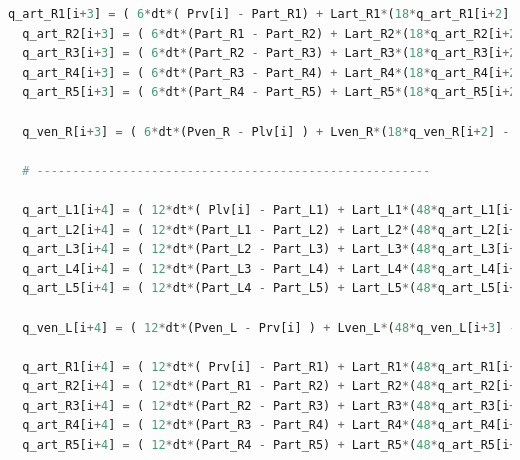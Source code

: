 \begin{lstlisting}[language=Python,caption={Математическая модель сердечно-сосудистой системы на языке программирования Python},label={list:cardiovascular_system_model}]
  q_art_R1[i+3] = ( 6*dt*( Prv[i] - Part_R1) + Lart_R1*(18*q_art_R1[i+2] - 9*q_art_R1[i+1] + 2*q_art_R1[i]) ) / (11*Lart_R1 + 6*dt*(Rart_R1 + Rpv)) 
  q_art_R2[i+3] = ( 6*dt*(Part_R1 - Part_R2) + Lart_R2*(18*q_art_R2[i+2] - 9*q_art_R2[i+1] + 2*q_art_R2[i]) ) / (11*Lart_R2 + 6*dt*Rart_R2)
  q_art_R3[i+3] = ( 6*dt*(Part_R2 - Part_R3) + Lart_R3*(18*q_art_R3[i+2] - 9*q_art_R3[i+1] + 2*q_art_R3[i]) ) / (11*Lart_R3 + 6*dt*Rart_R3)
  q_art_R4[i+3] = ( 6*dt*(Part_R3 - Part_R4) + Lart_R4*(18*q_art_R4[i+2] - 9*q_art_R4[i+1] + 2*q_art_R4[i]) ) / (11*Lart_R4 + 6*dt*Rart_R4)
  q_art_R5[i+3] = ( 6*dt*(Part_R4 - Part_R5) + Lart_R5*(18*q_art_R5[i+2] - 9*q_art_R5[i+1] + 2*q_art_R5[i]) ) / (11*Lart_R5 + 6*dt*Rart_R5)
  
  q_ven_R[i+3] = ( 6*dt*(Pven_R - Plv[i] ) + Lven_R*(18*q_ven_R[i+2] - 9*q_ven_R[i+1] + 2*q_ven_R[i]) ) / (11*Lven_R + 6*dt*(Rven_R + Rmv)) 

  # -------------------------------------------------------

  q_art_L1[i+4] = ( 12*dt*( Plv[i] - Part_L1) + Lart_L1*(48*q_art_L1[i+3] - 36*q_art_L1[i+2] + 16*q_art_L1[i+1] - 3*q_art_L1[i]) ) / (25*Lart_L1 + 12*dt*(Rart_L1 + Rav)) 
  q_art_L2[i+4] = ( 12*dt*(Part_L1 - Part_L2) + Lart_L2*(48*q_art_L2[i+3] - 36*q_art_L2[i+2] + 16*q_art_L2[i+1] - 3*q_art_L2[i]) ) / (25*Lart_L2 + 12*dt*Rart_L2)
  q_art_L3[i+4] = ( 12*dt*(Part_L2 - Part_L3) + Lart_L3*(48*q_art_L3[i+3] - 36*q_art_L3[i+2] + 16*q_art_L3[i+1] - 3*q_art_L3[i]) ) / (25*Lart_L3 + 12*dt*Rart_L3)
  q_art_L4[i+4] = ( 12*dt*(Part_L3 - Part_L4) + Lart_L4*(48*q_art_L4[i+3] - 36*q_art_L4[i+2] + 16*q_art_L4[i+1] - 3*q_art_L4[i]) ) / (25*Lart_L4 + 12*dt*Rart_L4)
  q_art_L5[i+4] = ( 12*dt*(Part_L4 - Part_L5) + Lart_L5*(48*q_art_L5[i+3] - 36*q_art_L5[i+2] + 16*q_art_L5[i+1] - 3*q_art_L5[i]) ) / (25*Lart_L5 + 12*dt*Rart_L5)
     
  q_ven_L[i+4] = ( 12*dt*(Pven_L - Prv[i] ) + Lven_L*(48*q_ven_L[i+3] - 36*q_ven_L[i+2] + 16*q_ven_L[i+1] - 3*q_ven_L[i]) ) / (25*Lven_L + 12*dt*(Rven_L + Rtr)) 

  q_art_R1[i+4] = ( 12*dt*( Prv[i] - Part_R1) + Lart_R1*(48*q_art_R1[i+3] - 36*q_art_R1[i+2] + 16*q_art_R1[i+1] - 3*q_art_R1[i]) ) / (25*Lart_R1 + 12*dt*(Rart_R1 + Rpv)) 
  q_art_R2[i+4] = ( 12*dt*(Part_R1 - Part_R2) + Lart_R2*(48*q_art_R2[i+3] - 36*q_art_R2[i+2] + 16*q_art_R2[i+1] - 3*q_art_R2[i]) ) / (25*Lart_R2 + 12*dt*Rart_R2)
  q_art_R3[i+4] = ( 12*dt*(Part_R2 - Part_R3) + Lart_R3*(48*q_art_R3[i+3] - 36*q_art_R3[i+2] + 16*q_art_R3[i+1] - 3*q_art_R3[i]) ) / (25*Lart_R3 + 12*dt*Rart_R3)
  q_art_R4[i+4] = ( 12*dt*(Part_R3 - Part_R4) + Lart_R4*(48*q_art_R4[i+3] - 36*q_art_R4[i+2] + 16*q_art_R4[i+1] - 3*q_art_R4[i]) ) / (25*Lart_R4 + 12*dt*Rart_R4)
  q_art_R5[i+4] = ( 12*dt*(Part_R4 - Part_R5) + Lart_R5*(48*q_art_R5[i+3] - 36*q_art_R5[i+2] + 16*q_art_R5[i+1] - 3*q_art_R5[i]) ) / (25*Lart_R5 + 12*dt*Rart_R5)


\end{lstlisting}
